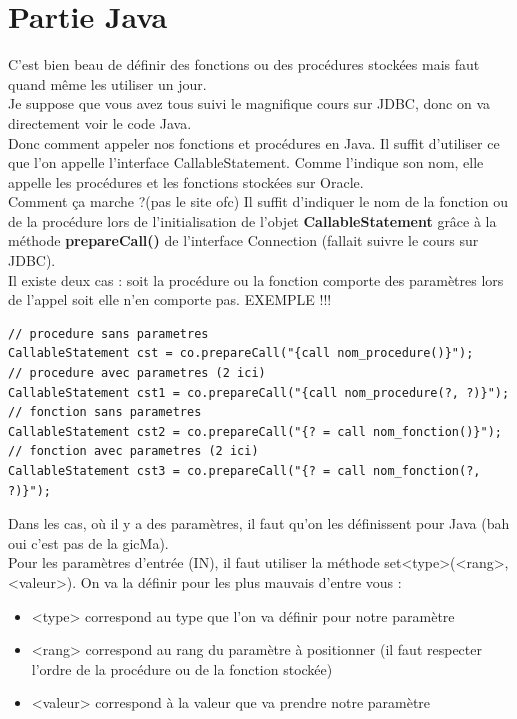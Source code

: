 \documentclass{report}
\begin{document}
\section{Partie Java}
C'est bien beau de définir des fonctions ou des procédures stockées mais faut quand même les utiliser un jour.\\
Je suppose que vous avez tous suivi le magnifique cours sur JDBC, donc on va directement voir le code Java.\\
Donc comment appeler nos fonctions et procédures en Java. Il suffit d'utiliser ce que l'on appelle l'interface CallableStatement. Comme l'indique son nom, elle appelle les procédures et les fonctions stockées sur Oracle.\\
Comment ça marche ?(pas le site ofc)
Il suffit d'indiquer le nom de la fonction ou de la procédure lors de l'initialisation de l'objet \textbf{CallableStatement} grâce à la méthode \textbf{prepareCall()} de l'interface Connection (fallait suivre le cours sur JDBC).\\
Il existe deux cas : soit la procédure ou la fonction comporte des paramètres lors de l'appel soit elle n'en comporte pas. EXEMPLE !!!

\begin{lstlisting}[style=MyJavaStyle]
// procedure sans parametres
CallableStatement cst = co.prepareCall("{call nom_procedure()}");
// procedure avec parametres (2 ici)
CallableStatement cst1 = co.prepareCall("{call nom_procedure(?, ?)}");
// fonction sans parametres
CallableStatement cst2 = co.prepareCall("{? = call nom_fonction()}");
// fonction avec parametres (2 ici)
CallableStatement cst3 = co.prepareCall("{? = call nom_fonction(?, ?)}");
\end{lstlisting}
Dans les cas, où il y a des paramètres, il faut qu'on les définissent pour Java (bah oui c'est pas de la gicMa).\\
Pour les paramètres d'entrée (IN), il faut utiliser la méthode set<type>(<rang>, <valeur>).
On va la définir pour les plus mauvais d'entre vous :
\begin{itemize}
\item <type> correspond au type que l'on va définir pour notre paramètre
\item <rang> correspond au rang du paramètre à positionner (il faut respecter l'ordre de la procédure ou de la fonction stockée)
\item <valeur> correspond à la valeur que va prendre notre paramètre
\end{itemize}
\end{document}
